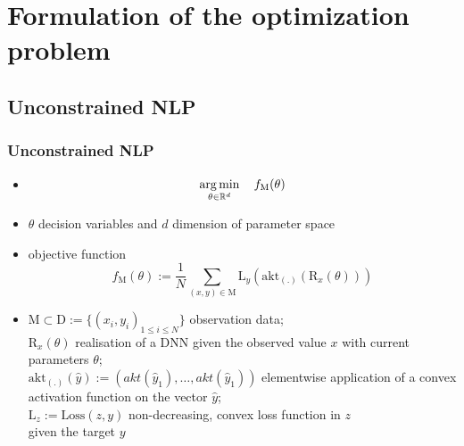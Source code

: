 



\beamertemplatenavigationsymbolsempty{}




\section{Formulation of the optimization problem}

   \subsection{Unconstrained NLP}
   
   \begin{frame}
   \frametitle{Unconstrained NLP}
   \begin{itemize}
   	\item[] $$\operatorname*{arg\,min}_{\theta\in\mathbb{R}^{d}}\quad f_{\mathrm{M}}(\theta)$$
   	\pause
   	\item $\theta$ decision variables and $d$ dimension of parameter space
    \pause
   	\item objective function
   	$$f_{\mathrm{M}}(\theta) := \frac{1}{N}\sum_{(x, y)\in\mathrm{M}}^{}\mathrm{L}_{y}(\text{akt}_{(.)}(\mathrm{R}_{x}(\theta)))$$
   	\pause
   	\item $\mathrm{M}\subset\mathrm{D} := \{(x_{i}, y_{i})_{1\leq i\leq N}\}$ observation data;\\ 
   	$\mathrm{R}_{x}(\theta)$ realisation of a DNN given the observed value $x$ with current parameters $\theta$;\\
   	$\text{akt}_{(.)}(\hat{y}) := \left(akt(\hat{y}_{1}), \ldots, akt(\hat{y}_{1})\right)$ elementwise application of a convex activation function on the vector $\hat{y}$;\\
   	$\mathrm{L}_{z} := \text{Loss}(z, y)$ non-decreasing, convex loss function in $z$\\ given the target $y$
   \end{itemize}
  \end{frame}
   
